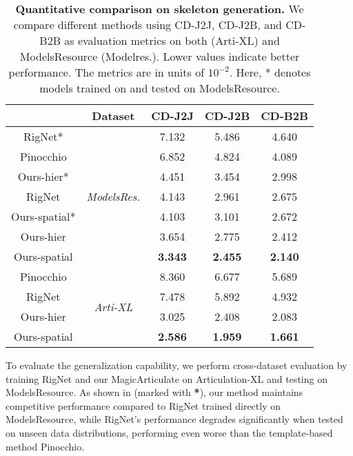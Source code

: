 \begin{table}
  \caption{\textbf{Quantitative comparison on skeleton generation.} We compare different methods using CD-J2J, CD-J2B, and CD-B2B as evaluation metrics on both \ourdata{} (Arti-XL) and ModelsResource (Modelres.). Lower values indicate better performance. The metrics are in units of $10^{-2}$. Here, * denotes models trained on \ourdata{} and tested on ModelsResource.}
  \vspace{-8pt}
  \label{comparison_skel}
  \centering
  \begin{tabular}{ccccc}
    \toprule
      & Dataset &  CD-J2J  & CD-J2B & CD-B2B \\
    \midrule
    RigNet*  & \multirow{7}{*}{\textit{ModelsRes.}} & 7.132 & 5.486 & 4.640 \\
    Pinocchio  &  & 6.852 & 4.824 & 4.089 \\
    Ours-hier*  &  & 4.451 & 3.454 & 2.998 \\
    RigNet  &  & 4.143 & 2.961  & 2.675 \\
    Ours-spatial*  &  & 4.103 & 3.101 & 2.672 \\
    Ours-hier     &   & 3.654 & 2.775 & 2.412     \\
    Ours-spatial     &   & \textbf{3.343} & \textbf{2.455} & \textbf{2.140}      \\
    
    \midrule
    Pinocchio  &\multirow{4}{*}{\textit{Arti-XL}} & 8.360 & 6.677  & 5.689 \\
    RigNet  & & 7.478 & 5.892 & 4.932   \\
    Ours-hier   &   & 3.025 & 2.408 & 2.083      \\
    Ours-spatial   &   & \textbf{2.586} & \textbf{1.959} & \textbf{1.661}      \\
    
    \bottomrule
  \end{tabular}
  \vspace{-15pt}
\end{table}

To evaluate the generalization capability, we 
perform cross-dataset evaluation by training RigNet and our MagicArticulate on Articulation-XL and testing on ModelsResource.
As shown in  (marked with \textbf{*}), our method maintains competitive performance compared to RigNet trained directly on ModelsResource, while RigNet's performance degrades significantly when tested on unseen data distributions, performing even worse than the template-based method Pinocchio.

